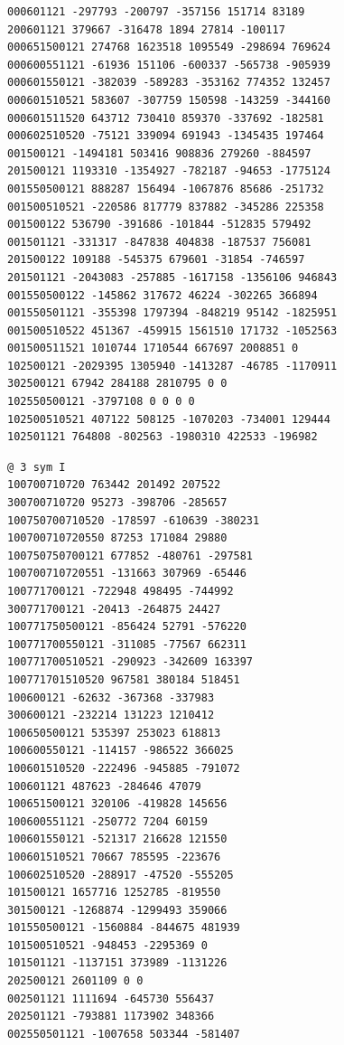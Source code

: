 \begin{Verbatim}[fontsize=\footnotesize]
000601121 -297793 -200797 -357156 151714 83189
200601121 379667 -316478 1894 27814 -100117
000651500121 274768 1623518 1095549 -298694 769624
000600551121 -61936 151106 -600337 -565738 -905939
000601550121 -382039 -589283 -353162 774352 132457
000601510521 583607 -307759 150598 -143259 -344160
000601511520 643712 730410 859370 -337692 -182581
000602510520 -75121 339094 691943 -1345435 197464
001500121 -1494181 503416 908836 279260 -884597
201500121 1193310 -1354927 -782187 -94653 -1775124
001550500121 888287 156494 -1067876 85686 -251732
001500510521 -220586 817779 837882 -345286 225358
001500122 536790 -391686 -101844 -512835 579492
001501121 -331317 -847838 404838 -187537 756081
201500122 109188 -545375 679601 -31854 -746597
201501121 -2043083 -257885 -1617158 -1356106 946843
001550500122 -145862 317672 46224 -302265 366894
001550501121 -355398 1797394 -848219 95142 -1825951
001500510522 451367 -459915 1561510 171732 -1052563
001500511521 1010744 1710544 667697 2008851 0
102500121 -2029395 1305940 -1413287 -46785 -1170911
302500121 67942 284188 2810795 0 0
102550500121 -3797108 0 0 0 0
102500510521 407122 508125 -1070203 -734001 129444
102501121 764808 -802563 -1980310 422533 -196982
\end{Verbatim}
\begin{Verbatim}[fontsize=\footnotesize]
@ 3 sym I
100700710720 763442 201492 207522
300700710720 95273 -398706 -285657
100750700710520 -178597 -610639 -380231
100700710720550 87253 171084 29880
100750750700121 677852 -480761 -297581
100700710720551 -131663 307969 -65446
100771700121 -722948 498495 -744992
300771700121 -20413 -264875 24427
100771750500121 -856424 52791 -576220
100771700550121 -311085 -77567 662311
100771700510521 -290923 -342609 163397
100771701510520 967581 380184 518451
100600121 -62632 -367368 -337983
300600121 -232214 131223 1210412
100650500121 535397 253023 618813
100600550121 -114157 -986522 366025
100601510520 -222496 -945885 -791072
100601121 487623 -284646 47079
100651500121 320106 -419828 145656
100600551121 -250772 7204 60159
100601550121 -521317 216628 121550
100601510521 70667 785595 -223676
100602510520 -288917 -47520 -555205
101500121 1657716 1252785 -819550
301500121 -1268874 -1299493 359066
101550500121 -1560884 -844675 481939
101500510521 -948453 -2295369 0
101501121 -1137151 373989 -1131226
202500121 2601109 0 0
002501121 1111694 -645730 556437
202501121 -793881 1173902 348366
002550501121 -1007658 503344 -581407
\end{Verbatim}
